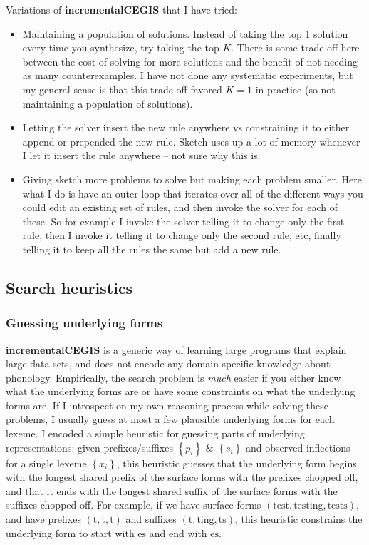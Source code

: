 \documentclass{article}
\begin{document}
Variations of \textbf{incrementalCEGIS} that I have tried:
\begin{itemize}
\item[] Maintaining a population of solutions. Instead of taking the top 1 solution every time you synthesize, try taking the top $K$. There is some trade-off here between the cost of solving for more solutions and
  the benefit of not needing as many counterexamples. I have not done any systematic experiments,
  but my general sense is that this trade-off favored $K = 1$ in practice (so not maintaining a population of solutions).
\item[] Letting the solver insert the new rule anywhere vs constraining it to either append or prepended the new rule. Sketch uses up a lot of memory whenever I let it insert the rule anywhere -- not sure why this is.
\item[] Giving sketch more problems to solve but making each problem smaller. Here what I do is have an outer loop that iterates over all of the different ways you could edit an existing set of rules, and then invoke the solver for each of these. So for example I invoke the solver telling it to change only the first rule,
  then I invoke it telling it to change only the second rule, etc, finally telling it to keep all the rules the same but add a new rule.
\end{itemize}

\subsection{Search heuristics}

\subsubsection{Guessing underlying forms}

\textbf{incrementalCEGIS} is a generic way of learning large programs that explain large data sets,
and does not encode any domain specific knowledge about phonology.
Empirically, the search problem is \emph{much} easier if you
either know what the underlying forms are or have some constraints on what the underlying forms are.
If I introspect on my own reasoning process while solving these problems,
I usually guess at most a few plausible underlying forms for each lexeme.
I encoded a simple heuristic for guessing parts of underlying representations:
given prefixes/suffixes $\left\{p_i \right\}$ \& $\left\{s_i \right\}$
and observed inflections for a single lexeme $\left\{x_i \right\}$,
this heuristic guesses that the underlying form begins with the longest shared prefix
of the surface forms with the prefixes chopped off,
and that it ends with the longest shared suffix of the surface forms with the suffixes chopped off.
For example, if we have surface forms $(\text{test},\text{testing},\text{tests})$,
and have prefixes $(\text{t},\text{t},\text{t})$ and suffixes $(\text{t},\text{ting},\text{ts})$,
this heuristic constrains the underlying form to start with $\text{es}$ and end with $\text{es}$.
\end{document}
